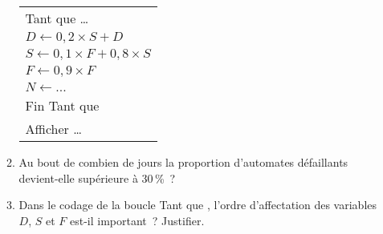 \begin{enumerate}
\begin{enumerate}[label=\alph*.]
\begin{center}
\begin{extern}
\begin{tabularx}{0.4\linewidth}{|X|}
                         Tant que \ldots\\
                         \hspace{1cm}$D \gets 0,2 \times S + D$\\
                         \hspace{1cm}$S \gets 0,1 \times F + 0,8 \times S$\\
                         \hspace{1cm}$F \gets 0,9 \times F$\\
                         \hspace{1cm}$N \gets ...$\\
                         Fin Tant que\\
                         Afficher \ldots\\ \hline
                    \end{tabularx}
               \end{extern}
          \end{center}
          \item  Au bout de combien de jours la proportion d'automates défaillants devient-elle
          supérieure à 30\,\%~?
          \item  Dans le codage de la boucle \og Tant que \fg, l'ordre d'affectation des
          variables $D$, $S$ et $F$ est-il important~? Justifier.
     \end{enumerate}
\end{enumerate}
